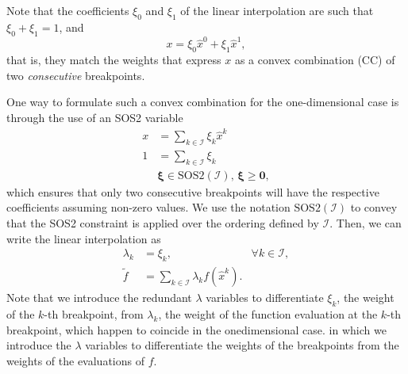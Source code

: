 \documentclass[pdflatex,sn-mathphys-num]{sn-jnl}%
\newcommand{\new}[1]{#1}
\begin{document}
\new{%
Note that the coefficients  $\xi_0$ and $\xi_1$ of the linear interpolation are such that $\xi_0+\xi_1=1$, and
\begin{equation}
x = \xi_{0}\hat{x}^0 + \xi_{1}\hat{x}^1
,\end{equation}
that is, they match the weights that express $x$ as a convex combination (CC) of two \emph{consecutive} breakpoints.
}
One way to formulate such a convex combination for the one-dimensional case is through the use of an SOS2 variable
\begin{equation}
\begin{aligned}
    x &= \sum_{k \in \mathcal{I}} \xi_{k}\hat{x}^{k} \\
    1 &= \sum_{k \in \mathcal{I}} \xi_{k} \\
      & \bm{\xi} \in \text{SOS2}(\mathcal{I}),\, \new{\bm{\xi} \ge \bm{0}},
\end{aligned}
\end{equation}
which ensures that only two consecutive breakpoints will have the respective coefficients assuming non-zero values.
\new{We use the notation $\text{SOS2}(\mathcal{I})$ to convey that the SOS2 constraint is applied over the ordering defined by $\mathcal{I}$.}
Then, we can write the linear interpolation as
\begin{equation}
\begin{aligned}
    \lambda_k &= \xi_{k},  & \forall k\in \mathcal{I}, \\
    \widetilde{f} &= \sum_{k\in \mathcal{I}} \lambda_k f(\hat{x}^{k})
.\end{aligned}
\end{equation}
\new{Note that we introduce the redundant $\lambda$ variables to differentiate $\xi_k$, the weight of the $k$-th breakpoint, from $\lambda_k$, the weight of the function evaluation at the $k$-th breakpoint, which happen to coincide in the onedimensional case.}
in which we introduce the $\lambda$ variables to differentiate the weights of the breakpoints from the weights of the evaluations of $f$.
\end{document}
